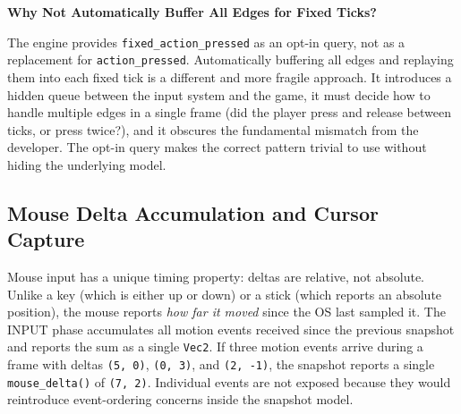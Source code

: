 \documentclass[
  11pt,
  letterpaper,
  DIV=11,
  numbers=noendperiod,
  twoside,
  open=right]{scrreprt}
\begin{document}
\begin{tcolorbox}[enhanced jigsaw, arc=.35mm, bottomrule=.15mm, breakable, colback=white, colframe=quarto-callout-warning-color-frame, left=2mm, leftrule=.75mm, opacityback=0, rightrule=.15mm, toprule=.15mm]
\begin{minipage}[t]{5.5mm}
\textcolor{quarto-callout-warning-color}{\faExclamationTriangle}
\end{minipage}%
\begin{minipage}[t]{\textwidth - 5.5mm}

\vspace{-3mm}\textbf{Why Not Automatically Buffer All Edges for Fixed Ticks?}\vspace{3mm}

The engine provides \texttt{fixed\_action\_pressed} as an opt-in query,
not as a replacement for \texttt{action\_pressed}. Automatically
buffering all edges and replaying them into each fixed tick is a
different and more fragile approach. It introduces a hidden queue
between the input system and the game, it must decide how to handle
multiple edges in a single frame (did the player press and release
between ticks, or press twice?), and it obscures the fundamental
mismatch from the developer. The opt-in query makes the correct pattern
trivial to use without hiding the underlying model.

\end{minipage}%
\end{tcolorbox}

\subsection{Mouse Delta Accumulation and Cursor
Capture}\label{mouse-delta-accumulation-and-cursor-capture}

Mouse input has a unique timing property: deltas are relative, not
absolute. Unlike a key (which is either up or down) or a stick (which
reports an absolute position), the mouse reports \emph{how far it moved}
since the OS last sampled it. The INPUT phase accumulates all motion
events received since the previous snapshot and reports the sum as a
single \texttt{Vec2}. If three motion events arrive during a frame with
deltas \texttt{(5,\ 0)}, \texttt{(0,\ 3)}, and \texttt{(2,\ -1)}, the
snapshot reports a single \texttt{mouse\_delta()} of \texttt{(7,\ 2)}.
Individual events are not exposed because they would reintroduce
event-ordering concerns inside the snapshot model.
\end{document}
